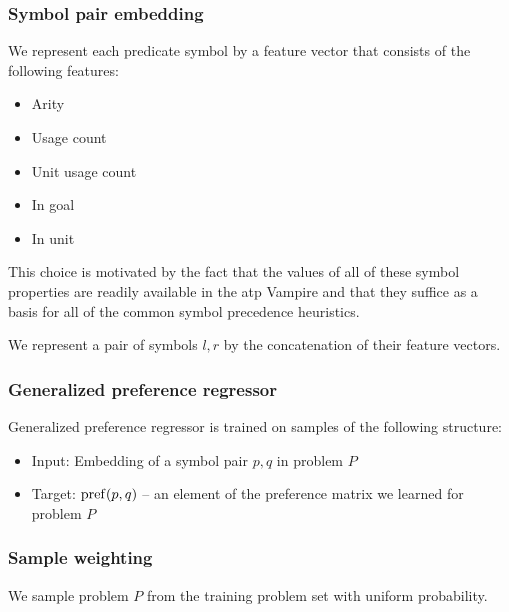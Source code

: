 \subsubsection{Symbol pair embedding}

We represent each predicate symbol by a feature vector that consists of the following features:

\begin{itemize}
	\item Arity
	\item Usage count
	\item Unit usage count
	\item In goal
	\item In unit
\end{itemize}

This choice is motivated by the fact that the values of all of these symbol properties
are readily available in the \gls{atp} Vampire
and that they suffice as a basis for all of the common symbol precedence heuristics.

We represent a pair of symbols \(l, r\) by the concatenation of their feature vectors.

\subsubsection{Generalized preference regressor}

Generalized preference regressor is trained on samples of the following structure:

\begin{itemize}
	\item Input: Embedding of a symbol pair \(p, q\) in problem \(P\)
	\item Target: \(\operatorname{pref}(p, q)\) -- an element of the preference matrix we learned for problem \(P\)
\end{itemize}

\subsubsection{Sample weighting}

We sample problem \(P\) from the training problem set with uniform probability.

